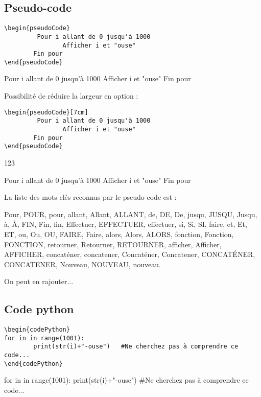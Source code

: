 \documentclass[a4paper,10pt]{article}
\begin{document}
		\subsection{Pseudo-code}
		
		\begin{verbatim}
\begin{pseudoCode}
         Pour i allant de 0 jusqu'à 1000
                Afficher i et "ouse"
        Fin pour
\end{pseudoCode}
		\end{verbatim}

\begin{pseudoCode}
	Pour i allant de 0 jusqu'à 1000
		Afficher i et "ouse"
	Fin pour
\end{pseudoCode}

Possibilité de réduire la largeur en option :
		\begin{verbatim}
\begin{pseudoCode}[7cm]
         Pour i allant de 0 jusqu'à 1000
                Afficher i et "ouse"
        Fin pour
\end{pseudoCode}
		\end{verbatim}
123
\begin{pseudoCode}[7cm]
	Pour i allant de 0 jusqu'à 1000
		Afficher i et "ouse"
	Fin pour
\end{pseudoCode}

La liste des mots clés reconnus par le pseudo code est :

Pour, POUR, pour, allant, Allant, ALLANT, de, DE, De, jusqu, JUSQU, Jusqu, à, À, FIN, Fin, fin, Effectuer, EFFECTUER, effectuer, si, Si, SI, faire, et, Et, ET, ou,
Ou, OU, FAIRE, Faire, alors, Alors, ALORS, fonction, Fonction, FONCTION, retourner, Retourner, RETOURNER, afficher, Afficher, AFFICHER, concaténer, concatener,
Concaténer, Concatener, CONCATÉNER, CONCATENER, Nouveau, NOUVEAU, nouveau.

On peut en rajouter...


		\subsection{Code python}
		
			\begin{verbatim}
\begin{codePython}
for in in range(1001):
        print(str(i)+"-ouse")	#Ne cherchez pas à comprendre ce code...
\end{codePython}
			\end{verbatim}
\begin{codePython}
for in in range(1001):
	print(str(i)+"-ouse")	#Ne cherchez pas à comprendre ce code...
\end{codePython}
\end{document}
